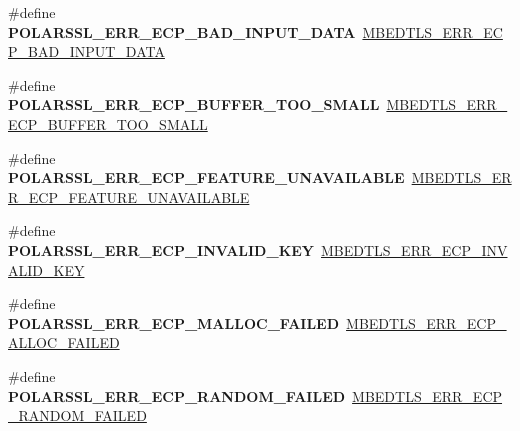 \begin{DoxyCompactItemize}
\item 
\mbox{\label{compat-1_83_8h_a59e5b00eddc35acbb507340379c4d056}} 
\#define {\bfseries P\+O\+L\+A\+R\+S\+S\+L\+\_\+\+E\+R\+R\+\_\+\+E\+C\+P\+\_\+\+B\+A\+D\+\_\+\+I\+N\+P\+U\+T\+\_\+\+D\+A\+TA}~\mbox{\hyperlink{ecp_8h_abcd6ff5c88f83a731383d344b56131f3}{M\+B\+E\+D\+T\+L\+S\+\_\+\+E\+R\+R\+\_\+\+E\+C\+P\+\_\+\+B\+A\+D\+\_\+\+I\+N\+P\+U\+T\+\_\+\+D\+A\+TA}}
\item 
\mbox{\label{compat-1_83_8h_a5dde870beebeca665d636398cd084fba}} 
\#define {\bfseries P\+O\+L\+A\+R\+S\+S\+L\+\_\+\+E\+R\+R\+\_\+\+E\+C\+P\+\_\+\+B\+U\+F\+F\+E\+R\+\_\+\+T\+O\+O\+\_\+\+S\+M\+A\+LL}~\mbox{\hyperlink{ecp_8h_a40adc3b18cac6225a491c07829a49b7c}{M\+B\+E\+D\+T\+L\+S\+\_\+\+E\+R\+R\+\_\+\+E\+C\+P\+\_\+\+B\+U\+F\+F\+E\+R\+\_\+\+T\+O\+O\+\_\+\+S\+M\+A\+LL}}
\item 
\mbox{\label{compat-1_83_8h_a87be7bf7e5b042e8ee3b73dbe5f3cc3a}} 
\#define {\bfseries P\+O\+L\+A\+R\+S\+S\+L\+\_\+\+E\+R\+R\+\_\+\+E\+C\+P\+\_\+\+F\+E\+A\+T\+U\+R\+E\+\_\+\+U\+N\+A\+V\+A\+I\+L\+A\+B\+LE}~\mbox{\hyperlink{ecp_8h_aa5a0e1548717d603ba5782c8ab6f5c24}{M\+B\+E\+D\+T\+L\+S\+\_\+\+E\+R\+R\+\_\+\+E\+C\+P\+\_\+\+F\+E\+A\+T\+U\+R\+E\+\_\+\+U\+N\+A\+V\+A\+I\+L\+A\+B\+LE}}
\item 
\mbox{\label{compat-1_83_8h_a200efec3d662151ea19bcd730807c769}} 
\#define {\bfseries P\+O\+L\+A\+R\+S\+S\+L\+\_\+\+E\+R\+R\+\_\+\+E\+C\+P\+\_\+\+I\+N\+V\+A\+L\+I\+D\+\_\+\+K\+EY}~\mbox{\hyperlink{ecp_8h_a20464525ea74ab8fcca9f59a12f5dc4b}{M\+B\+E\+D\+T\+L\+S\+\_\+\+E\+R\+R\+\_\+\+E\+C\+P\+\_\+\+I\+N\+V\+A\+L\+I\+D\+\_\+\+K\+EY}}
\item 
\mbox{\label{compat-1_83_8h_a01a0e6796f75c7bdd1a41312c4fa60c1}} 
\#define {\bfseries P\+O\+L\+A\+R\+S\+S\+L\+\_\+\+E\+R\+R\+\_\+\+E\+C\+P\+\_\+\+M\+A\+L\+L\+O\+C\+\_\+\+F\+A\+I\+L\+ED}~\mbox{\hyperlink{ecp_8h_a048bea0521e7928f75a6259a8fcbfecb}{M\+B\+E\+D\+T\+L\+S\+\_\+\+E\+R\+R\+\_\+\+E\+C\+P\+\_\+\+A\+L\+L\+O\+C\+\_\+\+F\+A\+I\+L\+ED}}
\item 
\mbox{\label{compat-1_83_8h_a8de4c3d074d63c08f314012b604c98c8}} 
\#define {\bfseries P\+O\+L\+A\+R\+S\+S\+L\+\_\+\+E\+R\+R\+\_\+\+E\+C\+P\+\_\+\+R\+A\+N\+D\+O\+M\+\_\+\+F\+A\+I\+L\+ED}~\mbox{\hyperlink{ecp_8h_a484c796d0d97513809f6042e51b42957}{M\+B\+E\+D\+T\+L\+S\+\_\+\+E\+R\+R\+\_\+\+E\+C\+P\+\_\+\+R\+A\+N\+D\+O\+M\+\_\+\+F\+A\+I\+L\+ED}}

\end{DoxyCompactItemize}
